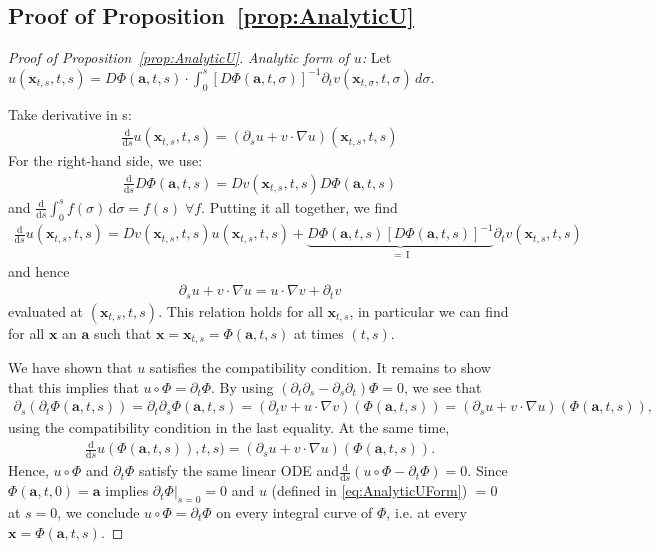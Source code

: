 \documentclass{article}
\newcommand{\bfx}{\boldsymbol{x}}
\newcommand{\bfa}{\boldsymbol{a}}
\newcommand{\rd}{\mathrm d}
\theoremstyle{definition}
\theoremstyle{plain}
\theoremstyle{definition}
\theoremstyle{remark}
\newcommand{\Flow}{\Phi}
\begin{document}
\subsection{Proof of Proposition~\ref{prop:AnalyticU}}
\begin{proof}[Proof of Proposition~\ref{prop:AnalyticU}]
\emph{Analytic form of $u$:} Let $u(\bfx_{t,s}, t, s) = D\Flow(\bfa, t, s) \cdot \int_0^s \left[ D\Flow(\bfa, t, \sigma) \right ]^{-1} \partial_t v(\bfx_{t,\sigma}, t, \sigma) \, d\sigma$.

    Take derivative in s:
    \begin{align}
        \frac{\mathrm d}{\mathrm d s} u(\bfx_{t,s}, t, s) = (\partial_s u + v \cdot \nabla u)(\bfx_{t,s}, t, s)
    \end{align}
    For the right-hand side, we use:
    \begin{align}
        \frac{\mathrm d}{\mathrm d s} D\Flow(\bfa, t, s) = Dv(\bfx_{t,s}, t, s) D\Flow(\bfa, t, s)
    \end{align}
    and $\frac{\mathrm d}{\mathrm d s} \int_0^s f(\sigma) \, \mathrm d\sigma = f(s) \; \forall f$. Putting it all together, we find
    \begin{align}
        \frac{\mathrm d}{\mathrm d s} u(\bfx_{t,s}, t, s) = Dv(\bfx_{t,s}, t, s) u(\bfx_{t,s}, t, s) + \underbrace{D\Flow(\bfa, t, s) \left[ D\Flow(\bfa, t, s) \right ]^{-1}}_{= \, \mathrm{I}} \partial_t v(\bfx_{t,s}, t, s)
    \end{align}
    and hence
    \begin{align}
        \partial_s u + v \cdot \nabla u = u \cdot \nabla v + \partial_t v
    \end{align}
    evaluated at $(\bfx_{t,s}, t, s)$.
    This relation holds for all $\bfx_{t,s}$, in particular we can find for all $\bfx$ an $\bfa$ such that $\bfx = \bfx_{t,s} = \Phi(\bfa, t, s)$ at times $(t, s)$.

We have shown that $u$ satisfies the compatibility condition. It remains to show that this implies that $u \circ \Flow = \partial_t \Flow$. By using $(\partial_t \partial_s - \partial_s \partial_t) \Flow = 0$, we see that
\begin{align}
    \partial_s \left( \partial_t \Flow(\bfa, t, s) \right) = \partial_t \partial_s \Flow(\bfa, t, s) = (\partial_t v + u \cdot \nabla v)(\Flow(\bfa, t, s)) = (\partial_s u + v \cdot \nabla u)(\Flow(\bfa, t, s)),
\end{align}
using the compatibility condition in the last equality. At the same time,
\begin{align}
    \frac{\rd}{\rd s} u(\Flow(\bfa, t, s)), t, s) = (\partial_s u + v \cdot \nabla u)(\Flow(\bfa, t, s)).
\end{align}
Hence, $u \circ \Flow$ and $\partial_t \Flow$ satisfy the same linear ODE and$\frac{\rd}{\rd s} \left( u \circ \Flow - \partial_t \Flow \right) = 0$. Since $\Phi(\bfa, t, 0) = \bfa$ implies $\partial_t \Flow \big |_{s = 0} = 0$ and $u$ (defined in \eqref{eq:AnalyticUForm}) $= 0$ at $s = 0$, we conclude $u \circ \Flow = \partial_t \Flow$ on every integral curve of $\Flow$, i.e. at every $\bfx = \Flow(\bfa, t, s)$.


\end{proof}
\end{document}
